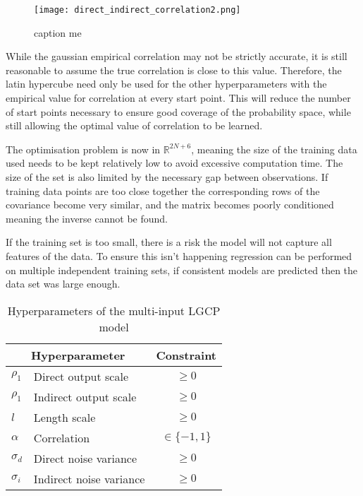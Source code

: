 \documentclass[a4paper,11pt]{report}
\begin{document}
\begin{figure}
\centering
\texttt{[image: direct\_indirect\_correlation2.png]}
\caption{caption me}
\label{fig:lcorrelation}
\end{figure}

While the gaussian empirical correlation may not be strictly accurate, it is still reasonable to assume the true correlation is close to this value. Therefore, the latin hypercube need only be used for the other hyperparameters with the empirical value for correlation at every start point. This will reduce the number of start points necessary to ensure good coverage of the probability space, while still allowing the optimal value of correlation to be learned.


The optimisation problem is now in \(\mathds{R}^{2N+6}\), meaning the size of the training data used needs to be kept relatively low to avoid excessive computation time. The size of the set is also limited by the necessary gap between observations. If training data points are too close together the corresponding rows of the covariance become very similar, and the matrix becomes poorly conditioned meaning the inverse cannot be found. \par

If the training set is too small, there is a risk the model will not capture all features of the data. To ensure this isn't happening regression can be performed on multiple independent training sets, if consistent models are predicted then the data set was large enough.


\begin{table}[]
\centering
\caption{Hyperparameters of the multi-input LGCP model}
\label{LGCPChyperparameters}
\begin{tabular}{ll|c}
\multicolumn{2}{c|}{\textbf{Hyperparameter}} & \textbf{Constraint} \\ \hline
\(\rho_1\)           & Direct output scale             & \(\geq0\)            \\
\(\rho_1\)             & Indirect output scale           & \(\geq0\)            \\
\(l\)          & Length scale                    & \(\geq0\)            \\
\(\alpha\)             & Correlation                     &  \(\in\{-1,1\}\)                   \\
\(\sigma_d\)             & Direct noise variance           &    \(\geq0\)                 \\
\(\sigma_i\)           & Indirect noise variance         &     \(\geq0\)               
\end{tabular}
\end{table}
\end{document}
